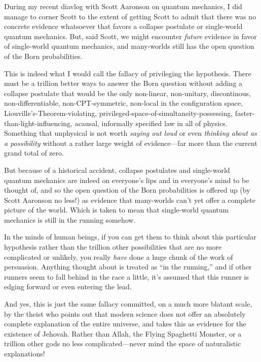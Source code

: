 {
 During my recent diavlog with Scott Aaronson on quantum mechanics,
I did manage to corner Scott to the extent of getting Scott to admit
that there was no concrete evidence whatsoever that favors a collapse
postulate or single-world quantum mechanics. But, said Scott, we might
encounter \textit{future} evidence in favor of single-world quantum
mechanics, and many-worlds still has the open question of the Born
probabilities.}

{
 This is indeed what I would call the fallacy of privileging the
hypothesis. There must be a trillion better ways to answer the Born
question without adding a collapse postulate that would be the only
non-linear, non-unitary, discontinous, non-differentiable,
non-CPT-symmetric, non-local in the configuration space,
Liouville's-Theorem-violating,
privileged-space-of-simultaneity-possessing,
faster-than-light-influencing, acausal, informally specified law in all
of physics. Something that unphysical is not worth \textit{saying out
loud} or even \textit{thinking about as a possibility} without a rather
large weight of evidence---far more than the current grand total of
zero.}

{
 But because of a historical accident, collapse postulates and
single-world quantum mechanics are indeed on everyone's
lips and in everyone's mind to be thought of, and so
the open question of the Born probabilities is offered up (by Scott
Aaronson no less!) as evidence that many-worlds can't
yet offer a complete picture of the world. Which is taken to mean that
single-world quantum mechanics is still in the running somehow.}

{
 In the minds of human beings, if you can get them to think about
this particular hypothesis rather than the trillion other possibilities
that are no more complicated or unlikely, you really \textit{have} done
a huge chunk of the work of persuasion. Anything thought about is
treated as ``in the running,'' and
if other runners seem to fall behind in the race a little,
it's assumed that this runner is edging forward or even
entering the lead.}

{
 And yes, this is just the same fallacy committed, on a much more
blatant scale, by the theist who points out that modern science does
not offer an absolutely complete explanation of the entire universe,
and takes this as evidence for the existence of Jehovah. Rather than
Allah, the Flying Spaghetti Monster, or a trillion other gods no less
complicated---never mind the space of naturalistic explanations!}

